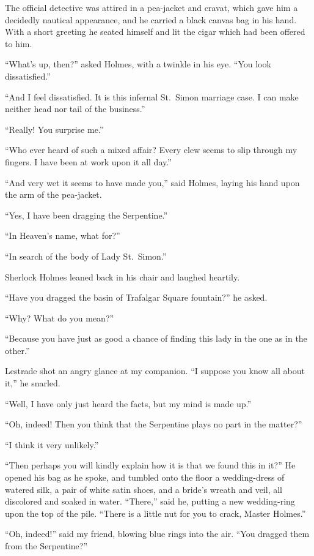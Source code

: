 The official detective was attired in a pea-jacket and cravat,
which gave him a decidedly nautical appearance, and he
carried a black canvas bag in his hand. With a short greeting
he seated himself and lit the cigar which had been offered
to him.

“What’s up, then?” asked Holmes, with a twinkle in his
eye. “You look dissatisfied.”

“And I feel dissatisfied. It is this infernal St.~Simon marriage
case. I can make neither head nor tail of the
business.”

“Really! You surprise me.”

“Who ever heard of such a mixed affair? Every clew
seems to slip through my fingers. I have been at work upon
it all day.”

“And very wet it seems to have made you,” said Holmes,
laying his hand upon the arm of the pea-jacket.

“Yes, I have been dragging the Serpentine.”

“In Heaven’s name, what for?”

“In search of the body of Lady St.~Simon.”

Sherlock Holmes leaned back in his chair and laughed
heartily.

“Have you dragged the basin of Trafalgar Sq\-uare fountain?”
he asked.

“Why? What do you mean?”

“Because you have just as good a chance of finding this
lady in the one as in the other.”

Lestrade shot an angry glance at my companion. “I suppose
you know all about it,” he snarled.

“Well, I have only just heard the facts, but my mind is
made up.”

“Oh, indeed! Then you think that the Serpentine plays
no part in the matter?”

“I think it very unlikely.”

“Then perhaps you will kindly explain how it is that we
found this in it?” He opened his bag as he spoke, and tumbled
onto the floor a wedding-dress of watered silk, a pair of
white satin shoes, and a bride’s wreath and veil, all discolored
and soaked in water. “There,” said he, putting a new wedding-ring
upon the top of the pile. “There is a little nut for
you to crack, Master Holmes.”

“Oh, indeed!” said my friend, blowing blue rings into the
air. “You dragged them from the Serpentine?”

